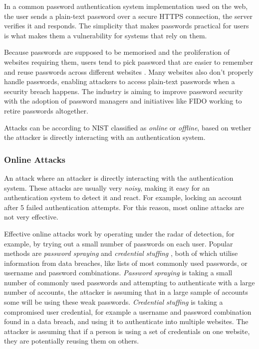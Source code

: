 In a common password authentication system implementation used on the web, the user sends a plain-text password over a secure HTTPS connection, the server verifies it and responds.
The simplicity that makes passwords practical for users is what makes them a vulnerability for systems that rely on them.

Because passwords are supposed to be memorised and the proliferation of websites requiring them, users tend to pick password that are easier to remember and reuse passwords across different websites \cite{conklin2004password}.
Many websites also don't properly handle passwords, enabling attackers to access plain-text passwords when a security breach happens.
The industry is aiming to improve password security with the adoption of password managers and initiatives like FIDO \cite{cho2014passwordless} working to retire passwords altogether.

Attacks can be according to NIST \cite{grassi2017} classified as \textit{online} or \textit{offline}, based on wether the attacker is directly interacting with an authentication system.


\subsubsection{Online Attacks} An attack where an attacker is directly interacting with the authentication system.
These attacks are usually very \textit{noisy}, making it easy for an authentication system to detect it and react.
For example, locking an account after 5 failed authentication attempts.
For this reason, most online attacks are not very effective.

Effective online attacks work by operating under the radar of detection, for example, by trying out a small number of passwords on each user.
Popular methods are \textit{password spraying} and \textit{credential stuffing} \cite{haber2020attack}, both of which utilise information from data breaches, like lists of most commonly used passwords, or username and password combinations.
\textit{Password spraying} is taking a small number of commonly used passwords and attempting to authenticate with a large number of accounts, the attacker is assuming that in a large sample of accounts some will be using these weak passwords.
\textit{Credential stuffing} is taking a compromised user credential, for example a username and password combination found in a data breach, and using it to authenticate into multiple websites.
The attacker is assuming that if a person is using a set of credentials on one website, they are potentially reusing them on others.

